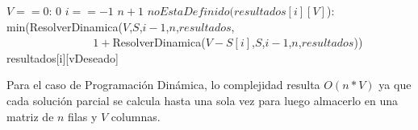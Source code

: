 \begin{codebox}
    \li \If $V == 0$:
         \Then
    \li         \Return $0$ 
    \End
    \li \If $i == -1$ 
        \Then
    \li                 \Return $n+1$
                \End
    \li \If $noEstaDefinido(resultados[i][V]$): 
        \Then 
    \li          \Return min(ResolverDinamica($V$,$S$,$i-1$,$n$,$resultados$,
                            \\ $\qquad\qquad$$\qquad\quad\,\,$ $1+$ResolverDinamica($V-S[i]$,$S$,$i-1$,$n$,$resultados$))
                            \End
    \li \Return resultados[i][vDeseado]

\par Para el caso de Programaci\'on Din\'amica, lo complejidad resulta $O(n*V)$ ya que cada soluci\'on parcial 
se calcula hasta una sola vez para luego almacerlo en una matriz de $n$ filas y $V$ columnas.


    \end{codebox}